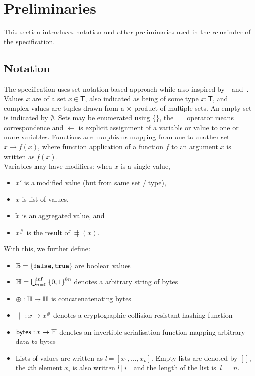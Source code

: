 \clearpage
\section{Preliminaries}\label{sec:prel}

This section introduces notation and other preliminaries used in the remainder
of the specification.

\subsection{Notation}

The specification uses set-notation based approach while also inspired
by~\cite{eutxo-2}~and~\cite{eutxo}. Values $x$ are of a set
$x \in \mathsf{T}$, also indicated as being of some type $x : \mathsf{T}$, and
complex values are tuples drawn from a $\times$ product of multiple sets. An
empty set is indicated by $\emptyset$. Sets may be enumerated using $\{\}$, the
$=$ operator means correspondence and $\gets$ is explicit assignment of a
variable or value to one or more variables. Functions are morphisms mapping from
one to another set $x \to f(x)$, where function application of
a function $f$ to an argument $x$ is written as $f(x)$. \\

\noindent Variables may have modifiers: when $x$ is a single value,
\begin{itemize}
  \item $x'$ is a modified value (but from same set / type),
  \item $\underline{x}$ is list of values,
  \item $\tilde{x}$ is an aggregated value, and
  \item $x^{\#}$ is the result of $\hash(x)$.
\end{itemize}

\noindent With this, we further define:
\begin{itemize}
  \item $\mathbb{B} = \{\mathtt{false}, \mathtt{true}\}$ are boolean values
  \item $\mathbb{H} = \bigcup_{n=0}^{\inf}{\{0,1\}}^{8n}$ denotes a arbitrary
        string of bytes
  \item $\oplus : \mathbb{H} \to \mathbb{H}$ is concatenatenating bytes
  \item $\hash : x \to x^{\#}$ denotes a cryptographic collision-resistant
        hashing function
  \item $\mathsf{bytes} : x \to \mathbb{H}$ denotes an invertible serialisation function
        mapping arbitrary data to bytes
  \item Lists of values are written as $l = [x_{1}, \ldots, x_{n}]$. Empty lists
        are denoted by $[]$, the $i$th element $x_{i}$ is also written $l[i]$
        and the length of the list is $|l| = n$.
\end{itemize}

